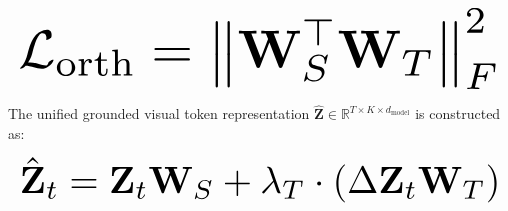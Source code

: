 \documentclass{article}
\begin{document}
\begin{equation}
\resizebox{\columnwidth}{!}{$\displaystyle
\begin{aligned}
\mathcal{L}_{\text{orth}} = \left\| \mathbf{W}_S^\top \mathbf{W}_T \right\|_F^2
\end{aligned}
$}
\end{equation}



























The unified grounded visual token representation $\hat{\mathbf{Z}} \in \mathbb{R}^{T \times K \times d_{\text{model}}}$ is constructed as:



























\begin{equation}
\resizebox{\columnwidth}{!}{$\displaystyle
\begin{aligned}
\hat{\mathbf{Z}}_t = \mathbf{Z}_t \mathbf{W}_S + \lambda_T \cdot \left( \Delta \mathbf{Z}_t \mathbf{W}_T \right)
\end{aligned}
$}
\end{equation}
\end{document}
